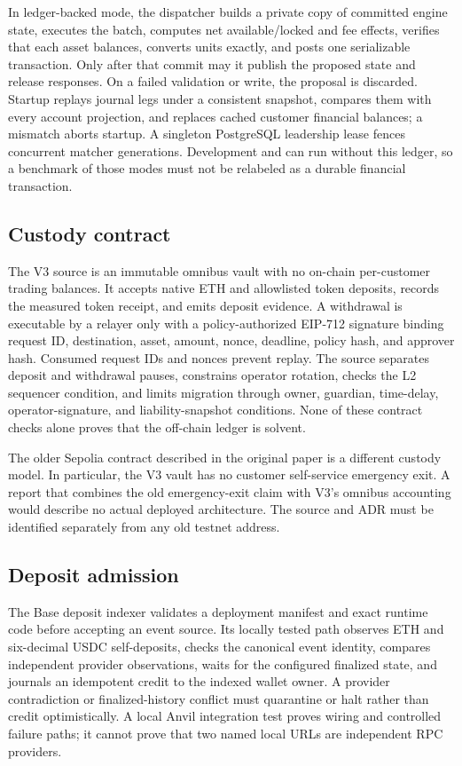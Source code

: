 \documentclass[envcountsame,runningheads,notitlepage]{llncs}
\newcommand{\pathref}[1]{\texttt{\detokenize{#1}}}
\begin{document}
In ledger-backed mode, the dispatcher builds a private copy of committed engine state, executes the batch, computes net available/locked and fee effects, verifies that each asset balances, converts units exactly, and posts one serializable transaction. Only after that commit may it publish the proposed state and release responses. On a failed validation or write, the proposal is discarded. Startup replays journal legs under a consistent snapshot, compares them with every account projection, and replaces cached customer financial balances; a mismatch aborts startup. A singleton PostgreSQL leadership lease fences concurrent matcher generations. Development and \pathref{testnet-demo} can run without this ledger, so a benchmark of those modes must not be relabeled as a durable financial transaction.\cite{adrs,ledgerboundary}

\subsection{Custody contract}
The V3 \pathref{VelaSettlement} source is an immutable omnibus vault with no on-chain per-customer trading balances. It accepts native ETH and allowlisted token deposits, records the measured token receipt, and emits deposit evidence. A withdrawal is executable by a relayer only with a policy-authorized EIP-712 signature binding request ID, destination, asset, amount, nonce, deadline, policy hash, and approver hash. Consumed request IDs and nonces prevent replay. The source separates deposit and withdrawal pauses, constrains operator rotation, checks the L2 sequencer condition, and limits migration through owner, guardian, time-delay, operator-signature, and liability-snapshot conditions. None of these contract checks alone proves that the off-chain ledger is solvent.\cite{source}

The older Sepolia contract described in the original paper is a different custody model. In particular, the V3 vault has no customer self-service emergency exit. A report that combines the old emergency-exit claim with V3's omnibus accounting would describe no actual deployed architecture. The source and ADR must be identified separately from any old testnet address.\cite{adrs,vela2026}

\subsection{Deposit admission}
The Base deposit indexer validates a deployment manifest and exact runtime code before accepting an event source. Its locally tested path observes ETH and six-decimal USDC self-deposits, checks the canonical event identity, compares independent provider observations, waits for the configured finalized state, and journals an idempotent credit to the indexed wallet owner. A provider contradiction or finalized-history conflict must quarantine or halt rather than credit optimistically. A local Anvil integration test proves wiring and controlled failure paths; it cannot prove that two named local URLs are independent RPC providers.\cite{staging}
\end{document}

